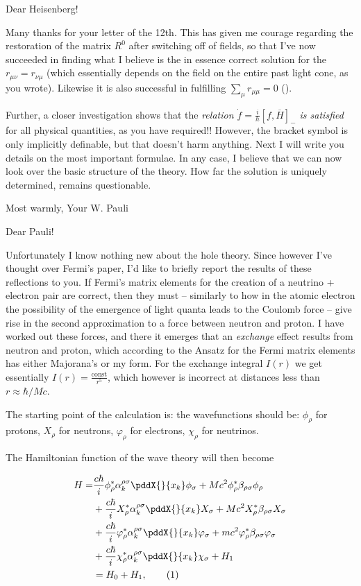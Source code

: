 \documentclass{article}
\newcommand{\nequ}[2]{
\begin{align*}
#1
\tag{#2}
\end{align*}
}
\newcommand{\sumX}[1]{\underset{#1}{\sum}}
\begin{document}
\date{January 16, 1934}

Dear Heisenberg!

Many thanks for your letter of the 12th. 
This has given me courage regarding the restoration of the matrix $R^0$ after switching off of fields, so that I've now succeeded in finding what I believe is the in essence correct solution for the $r_{\mu\nu}=r_{\nu\mu}$ (which essentially depends on the field on the entire past light cone, as you wrote).
Likewise it is also successful in fulfilling $\sumX{\mu}r_{\mu\mu}=0$ ().

Further, a closer investigation shows that the \textit{relation $\dot{f}=\frac{i}{h}[f,\overline{H}]_{-}$ is satisfied} for all physical quantities, as you have required!!
However, the bracket symbol is only  implicitly definable, but that doesn't harm anything.
Next I will write you details on the most important formulae. In any case, I believe that we can now look over the basic structure of the theory. How far the solution is uniquely determined, remains questionable.

Most warmly,
Your W. Pauli

\date{January 18, 1934}

Dear Pauli!

Unfortunately I know nothing new about the hole theory. Since however I've thought over Fermi's paper, I'd like to briefly report the results of these reflections to you. If Fermi's matrix elements for the creation of a neutrino + electron pair are correct, then they must -- similarly to how in the atomic electron the possibility of the emergence of light quanta leads to the Coulomb force -- give rise in the second approximation to a force between neutron and proton. I have worked out these forces, and there it emerges that an \textit{exchange} effect results from neutron and proton, which according to the Ansatz for the Fermi matrix elements has either Majorana's or my form. For the exchange integral $I(r)$ we get essentially $I(r) = \frac{\text{const}}{r^5}$, which however is incorrect at distances less than $r \approx \hbar/Mc$.

The starting point of the calculation is: the wavefunctions should be: $\phi_\rho$ for protons, $X_\rho$ for neutrons, $\varphi_\rho$ for electrons, $\chi_\rho$ for neutrinos.

The Hamiltonian function of the wave theory will then become
\nequ{
H = &\frac{c\hbar}{i}\phi^*_\rho \alpha^{\rho\sigma}_k \pddX{}{x_k}\phi_\sigma + 
    Mc^2 \phi^*_\rho \beta_{\rho \sigma}\phi_\rho\\
   &+\frac{c\hbar}{i}X^*_\rho \alpha^{\rho\sigma}_k \pddX{}{x_k} X_\sigma + 
    Mc^2 X^*_\rho \beta_{\rho\sigma} X_\sigma\\
   &+\frac{c\hbar}{i}\varphi^*_\rho \alpha^{\rho\sigma}_k \pddX{}{x_k}\varphi_\sigma + 
    mc^2 \varphi^*_\rho \beta_{\rho\sigma} \varphi_\sigma\\
   &+\frac{c\hbar}{i}\chi^*_\rho \alpha^{\rho \sigma}_k\pddX{}{x_k}\chi_\sigma + H_1\\
   &= H_0 + H_1,}{1}
\end{document}
